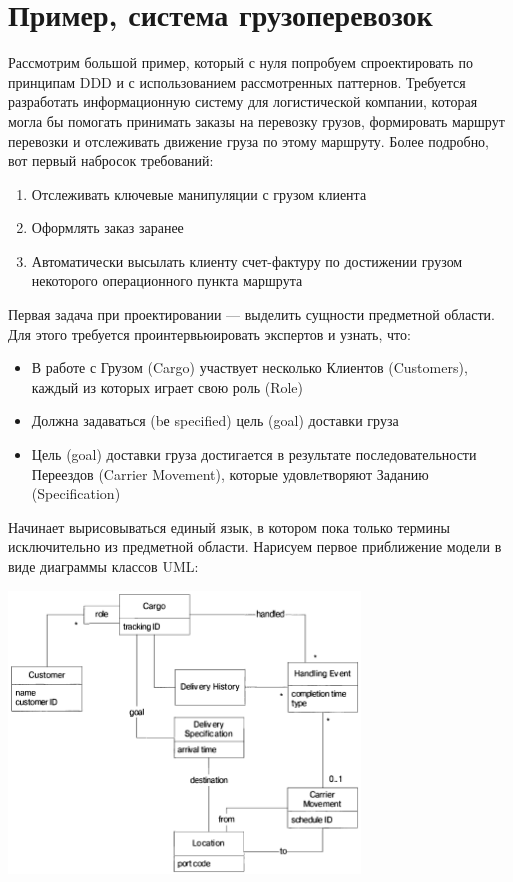 \documentclass[a5paper]{article}
\begin{document}
\section{Пример, система грузоперевозок}

Рассмотрим большой пример, который с нуля попробуем спроектировать по принципам DDD и с использованием рассмотренных паттернов. Требуется разработать информационную систему для логистической компании, которая могла бы помогать принимать заказы на перевозку грузов, формировать маршрут перевозки и отслеживать движение груза по этому маршруту. Более подробно, вот первый набросок требований:

\begin{enumerate}
    \item Отслеживать ключевые манипуляции с грузом клиента
    \item Оформлять заказ заранее
    \item Автоматически высылать клиенту счет-фактуру по достижении грузом некоторого операционного пункта маршрута
\end{enumerate}

Первая задача при проектировании --- выделить сущности предметной области. Для этого требуется проинтервьюировать экспертов и узнать, что:

\begin{itemize}
    \item В работе с Грузом (Cargo) участвует несколько Клиентов (Customers), каждый из которых играет свою роль (Role)
    \item Должна задаваться (bе specified) цель (goal) доставки груза
    \item Цель (goal) доставки груза достигается в результате последовательности Переездов (Carrier Movement), которые удовлeтворяют Заданию (Specification)
\end{itemize}

Начинает вырисовываться единый язык, в котором пока только термины исключительно из предметной области. Нарисуем первое приближение модели в виде диаграммы классов UML:

\begin{center}
    \includegraphics[width=0.7\textwidth]{cargoModel.png}
\end{center}
\end{document}
